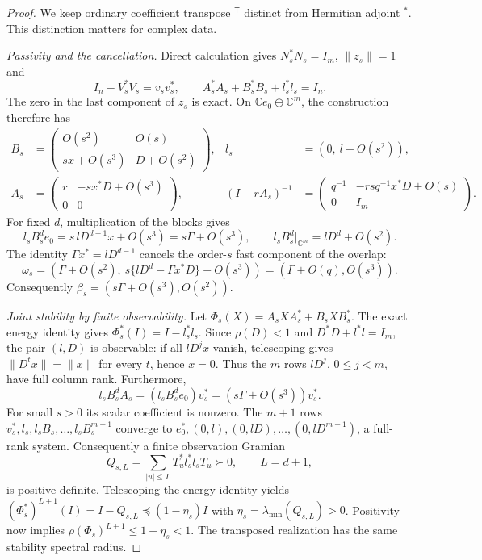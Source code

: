 \begin{proof}
We keep ordinary coefficient transpose ${}^{\mathsf T}$ distinct from
Hermitian adjoint ${}^*$.  This distinction matters for complex data.

\emph{Passivity and the cancellation.}
Direct calculation gives $N_s^*N_s=I_m$, $\|z_s\|=1$ and
\[
 I_n-V_s^*V_s=v_sv_s^*,\qquad
 A_s^*A_s+B_s^*B_s+l_s^*l_s=I_n.
\]
The zero in the last component of $z_s$ is exact.  On
$\mathbb Ce_0\oplus\mathbb C^m$, the construction therefore has
\begin{align}
 B_s&=\begin{pmatrix}O(s^2)&O(s)\\
                sx+O(s^3)&D+O(s^2)\end{pmatrix},&
 l_s&=(0,\ l+O(s^2)),\label{I:R:eq:v4-match-blocks}\\
 A_s&=\begin{pmatrix}r&-sx^*D+O(s^3)\\0&0\end{pmatrix},&
 (I-rA_s)^{-1}
 &=\begin{pmatrix}q^{-1}&-rsq^{-1}x^*D+O(s)\\0&I_m\end{pmatrix}.
 \label{I:R:eq:v4-match-resolvent}
\end{align}
For fixed $d$, multiplication of the blocks gives
\[
 l_sB_s^de_0=s\,lD^{d-1}x+O(s^3)=s\Gamma+O(s^3),\qquad
 l_sB_s^d|_{\mathbb C^m}=lD^d+O(s^2).
\]
The identity $\Gamma x^*=lD^{d-1}$ cancels the order-$s$ fast
component of the overlap:
\begin{equation}
 \omega_s=(\Gamma+O(s^2),\
 s\{lD^d-\Gamma x^*D\}+O(s^3))
          =(\Gamma+O(q),O(s^3)).
 \label{I:R:eq:v4-match-cancellation}
\end{equation}
Consequently $\beta_s=(s\Gamma+O(s^3),O(s^2))$.

\emph{Joint stability by finite observability.}
Let $\Phi_s(X)=A_sXA_s^*+B_sXB_s^*$. The exact energy identity gives
$\Phi_s^*(I)=I-l_s^*l_s$. Since $\rho(D)<1$ and
$D^*D+l^*l=I_m$, the pair $(l,D)$ is observable: if all $lD^jx$
vanish, telescoping gives $\|D^t x\|=\|x\|$ for every $t$, hence $x=0$.
Thus the $m$ rows $lD^j$, $0\le j<m$, have full column rank.
Furthermore,
\[
 l_sB_s^dA_s=(l_sB_s^de_0)v_s^*
           =(s\Gamma+O(s^3))v_s^*.
\]
For small $s>0$ its scalar coefficient is nonzero. The $m+1$ rows
$v_s^*,l_s,l_sB_s,\ldots,l_sB_s^{m-1}$ converge to
$e_0^*,(0,l),(0,lD),\ldots,(0,lD^{m-1})$, a full-rank system.
Consequently a finite observation Gramian
\[
 Q_{s,L}=\sum_{|u|\le L}T_u^*l_s^*l_sT_u\succ0,
 \qquad L=d+1,
\]
is positive definite. Telescoping the energy identity yields
$(\Phi_s^*)^{L+1}(I)=I-Q_{s,L}\preceq(1-\eta_s)I$ with
$\eta_s=\lambda_{\min}(Q_{s,L})>0$. Positivity now implies
$\rho(\Phi_s)^{L+1}\le1-\eta_s<1$.
The transposed realization has the same stability spectral radius.


\end{proof}
